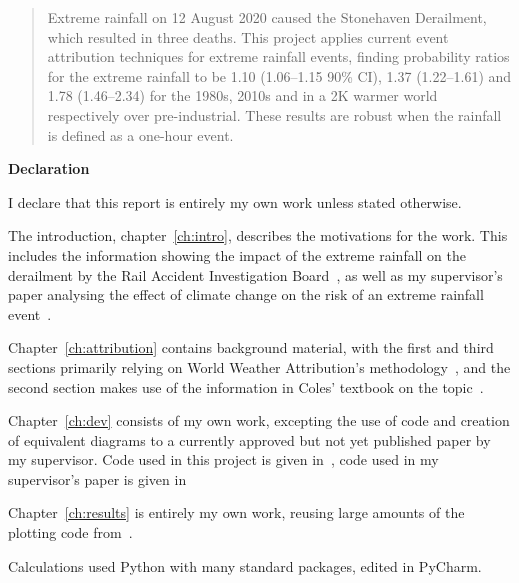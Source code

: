 \documentclass[12pt,a4paper,oneside]{report}
\begin{document}
\newpage



\begin{abstract}

Extreme rainfall on 12 August 2020 caused the Stonehaven Derailment,
    which resulted in three deaths.
This project applies current event attribution techniques for extreme rainfall events,
    finding probability ratios for the extreme rainfall to be 1.10 (1.06--1.15 90\% CI),
    1.37 (1.22--1.61) and 1.78 (1.46--2.34) for the 1980s, 2010s and in a 2K warmer world
    respectively over pre-industrial.
These results are robust when the rainfall is defined as a one-hour event.

\end{abstract}


\begin{center}
\textbf{Declaration}
\end{center}

I declare that this report is entirely my own work unless stated otherwise.

The introduction, chapter~\ref{ch:intro}, describes the motivations for the work.
This includes the information showing the impact of the extreme rainfall on the derailment by the Rail Accident Investigation Board~\cite{RAIB_2022},
    as well as my supervisor's paper analysing the effect of climate change on the risk of an extreme rainfall event~\cite{Tett_Soon}.

Chapter~\ref{ch:attribution} contains background material,
    with the first and third sections primarily relying on World Weather Attribution's methodology~\cite{van_Oldenborgh_et_al_2021},
    and the second section makes use of the information in Coles' textbook on the topic~\cite{Coles_2001}.

Chapter~\ref{ch:dev} consists of my own work,
    excepting the use of code and creation of equivalent diagrams to a currently approved but not yet published paper by my supervisor.
Code used in this project is given in~\cite{Me_Code},
    code used in my supervisor's paper is given in~\cite{Tett_Code}

Chapter~\ref{ch:results} is entirely my own work,
    reusing large amounts of the plotting code from~\cite{Tett_Soon}.

\bigskip

Calculations used Python with many standard packages, edited in PyCharm.
\end{document}
